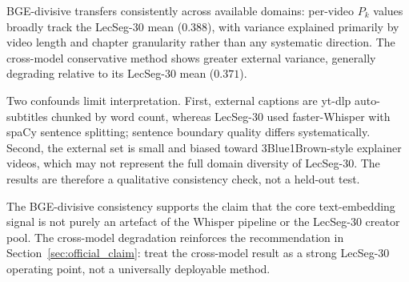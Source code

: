 BGE-divisive transfers consistently across available domains: per-video $P_k$
values broadly track the LecSeg-30 mean ($0.388$), with variance explained
primarily by video length and chapter granularity rather than any systematic
direction.
The cross-model conservative method shows greater external variance,
generally degrading relative to its LecSeg-30 mean ($0.371$).

Two confounds limit interpretation.
First, external captions are yt-dlp auto-subtitles chunked by word count,
whereas LecSeg-30 used faster-Whisper with spaCy sentence splitting;
sentence boundary quality differs systematically.
Second, the external set is small and biased toward 3Blue1Brown-style
explainer videos, which may not represent the full domain diversity of
LecSeg-30.
The results are therefore a qualitative consistency check, not a held-out test.

The BGE-divisive consistency supports the claim that the core text-embedding
signal is not purely an artefact of the Whisper pipeline or the LecSeg-30
creator pool.
The cross-model degradation reinforces the recommendation in
Section~\ref{sec:official_claim}: treat the cross-model result as a strong
LecSeg-30 operating point, not a universally deployable method.
